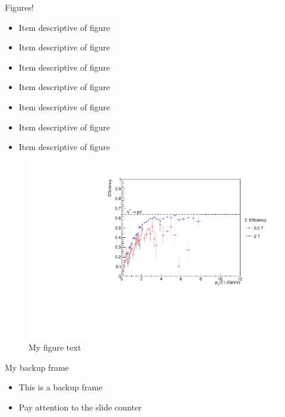\documentclass[9pt, aspectratio=169]{beamer}
\begin{document}
\begin{frame}{Figures!}
    \begin{minipage}{0.39\textwidth}
        \begin{itemize}
            \item Item descriptive of figure
            \item Item descriptive of figure
            \item Item descriptive of figure
            \item Item descriptive of figure
            \item Item descriptive of figure
            \item Item descriptive of figure
            \item Item descriptive of figure
        \end{itemize}
    \end{minipage}
    \begin{minipage}{0.59\textwidth}
        \begin{figure}[h]
            \centering
            \includegraphics[width=1\linewidth]{smi-template/XiEffVsPt.pdf}
            \caption{My figure text}
            \label{fig:enter-label}
        \end{figure}
    \end{minipage}
\end{frame}

\beginbackup
\begin{frame}{My backup frame}
    \begin{itemize}
        \item This is a backup frame
        \item Pay attention to the slide counter
    \end{itemize}
\end{frame}
\end{document}
